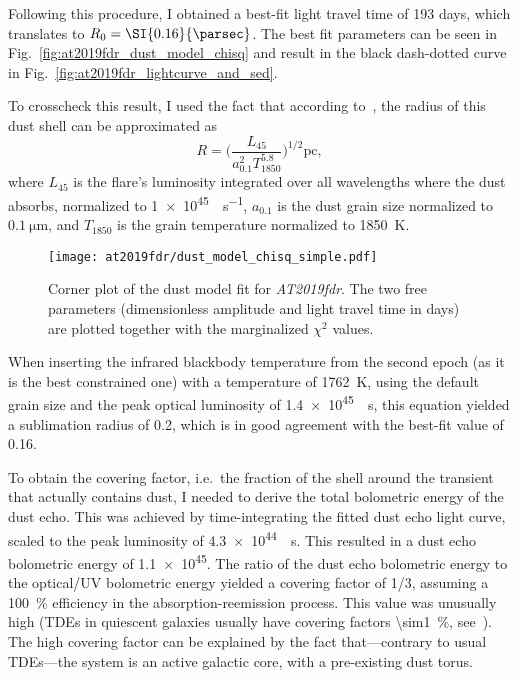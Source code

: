 Following this procedure, I obtained a best-fit light travel time of 193 days, which translates to $R_0=\SI{0.16}{\parsec}$. The best fit parameters can be seen in Fig.~\ref{fig:at2019fdr_dust_model_chisq} and result in the black dash-dotted curve in Fig.~\ref{fig:at2019fdr_lightcurve_and_sed}.

To crosscheck this result, I used the fact that according to~\cite{Velzen2016}, the radius of this dust shell can be approximated as
\begin{equation}
    R= \bigg(\frac{L_{45}}{a_{0.1}^2 T_{1850}^{5.8}} \bigg)^{1/2} \text{pc},
\end{equation}
where $L_{45}$ is the flare's luminosity integrated over all wavelengths where the dust absorbs, normalized to \SI{1e45}{\erg\per\s}, $a_{0.1}$ is the dust grain size normalized to $\SI{0.1}{\micro\m}$, and $T_{1850}$ is the grain temperature normalized to \SI{1850}{\K}.

\begin{figure}[htb]
    \texttt{[image: at2019fdr/dust\_model\_chisq\_simple.pdf]}
    \caption[Dust model fit corner plot]{Corner plot of the dust model fit for \emph{AT2019fdr}. The two free parameters (dimensionless amplitude and light travel time in days) are plotted together with the marginalized $\chi^2$ values.}
\end{figure}

When inserting the infrared blackbody temperature from the second epoch (as it is the best constrained one) with a temperature of \SI{1762}{\K}, using the default grain size and the peak optical luminosity of \SI{1.4e45}{\erg\s}, this equation yielded a sublimation radius of \SI{0.2}{\parsec}, which is in good agreement with the best-fit value of \SI{0.16}{\parsec}.

To obtain the covering factor, i.e.\ the fraction of the shell around the transient that actually contains dust, I needed to derive the total bolometric energy of the dust echo. This was achieved by time-integrating the fitted dust echo light curve, scaled to the peak luminosity of \SI{4.3e44}{\erg\s}. This resulted in a dust echo bolometric energy of \SI{1.1e45}{\erg}. The ratio of the dust echo bolometric energy to the optical/UV bolometric energy yielded a covering factor of 1/3, assuming a \SI{100}{\percent} efficiency in the absorption-reemission process. This value was unusually high (TDEs in quiescent galaxies usually have covering factors \SI{\sim1}{\percent}, see~\cite{Velzen2016}). The high covering factor can be explained by the fact that---contrary to usual TDEs---the system is an active galactic core, with a pre-existing dust torus.

